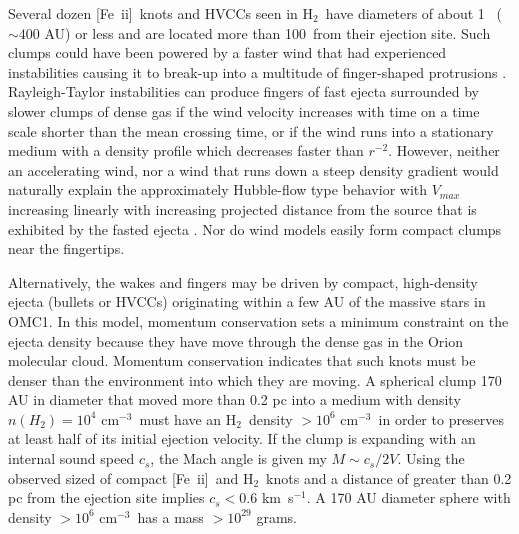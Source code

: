 \documentclass[12pt,preprint]{aastex}
\newcommand{\kms}{km~s{$^{-1}$}}
\newcommand{\Feii}{[Fe~{\sc ii}]}
\newcommand{\hh}{\ensuremath{\textrm{H}_{2}}}			%
\newcommand{\percc}{\ensuremath{\textrm{cm}^{-3}}}
\begin{document}
Several dozen \Feii\ knots  and HVCCs seen in  \hh\  have diameters
of about  1 \arcsec\ ($\sim400$ AU) or less and are located more than 
100\arcsec\ from their ejection site.    Such clumps could have been powered by a 
faster wind that had experienced instabilities causing it to break-up into a multitude of
finger-shaped protrusions \cite{McCaughrean_MacLow1997}.    Rayleigh-Taylor
instabilities can produce fingers of fast ejecta surrounded by slower clumps of dense 
gas if the wind velocity increases with time on a time scale shorter than the mean
crossing time,  or if the wind runs into a stationary medium with a density profile 
which decreases faster than $r^{-2}$.   However, neither an accelerating wind, nor
a wind that runs down a steep density gradient would naturally explain the
approximately Hubble-flow type behavior with $V_{max}$ increasing linearly with
increasing projected distance from the source that is exhibited by the fasted ejecta 
\citep{Bally2011}.   Nor do wind models easily form compact clumps near the fingertips.

Alternatively, the wakes and fingers may be driven by compact,  high-density ejecta
(bullets or HVCCs) originating within a few AU of the massive stars in OMC1.   
In this  model, momentum conservation sets a minimum constraint
on the ejecta density because they have move through the dense gas in the Orion
molecular cloud.     Momentum conservation indicates that such knots must be denser 
than the environment into which they are moving.  A spherical clump 170 AU
in diameter that moved more than 0.2 pc into a medium with density 
$n(H_2) = 10^4$ \percc\ must have an \hh\  density  $>  10^6$ \percc\ in order
to preserves at least half of its initial ejection velocity.  If the clump is expanding
with an internal sound speed $c_s$, the Mach angle is given my $M \sim c_s/ 2 V$.
Using the observed sized of compact \Feii\ and \hh\ knots and a distance of
greater than 0.2 pc from the ejection site implies $c_s < 0.6$ \kms .   A 170 AU diameter
sphere with density $>  10^6$ \percc\ has a mass $> 10^{29}$ grams. 
\end{document}
